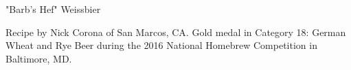 \stylesection{\styleweissbier}

\begin{recipe}{"Barb's Hef" Weissbier} %

\begin{aboutblock}
Recipe by Nick Corona of San Marcos, CA. Gold medal in Category 18: German
Wheat and Rye Beer during the 2016 National Homebrew Competition in
Baltimore, MD. \sourceaha
\end{aboutblock}


\begin{methodandtiming}
 
\begin{mashsteps}
\end{mashsteps}

\begin{fermentationsteps}
\end{fermentationsteps}

\end{methodandtiming}

\recipebreak

\begin{ingredientsblock}

\begin{malts}
\end{malts}

\begin{hops}
\end{hops}


\end{ingredientsblock}

\end{recipe}

